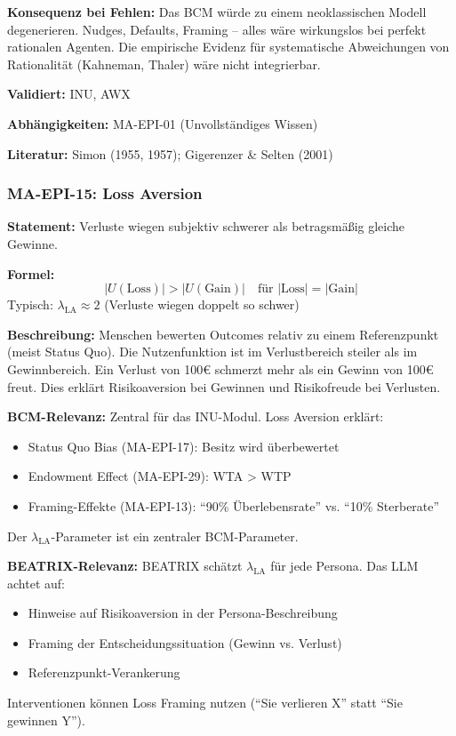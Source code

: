 \textbf{Konsequenz bei Fehlen:}
Das BCM würde zu einem neoklassischen Modell degenerieren. Nudges, Defaults, Framing -- alles wäre wirkungslos bei perfekt rationalen Agenten. Die empirische Evidenz für systematische Abweichungen von Rationalität (Kahneman, Thaler) wäre nicht integrierbar.

\textbf{Validiert:} INU, AWX

\textbf{Abhängigkeiten:} MA-EPI-01 (Unvollständiges Wissen)

\textbf{Literatur:} Simon (1955, 1957); Gigerenzer \& Selten (2001)


\subsubsection*{MA-EPI-15: Loss Aversion}

\textbf{Statement:} Verluste wiegen subjektiv schwerer als betragsmäßig gleiche Gewinne.

\textbf{Formel:}
\begin{equation}
|U(\text{Loss})| > |U(\text{Gain})| \quad \text{für } |\text{Loss}| = |\text{Gain}|
\end{equation}
Typisch: $\lambda_{\text{LA}} \approx 2$ (Verluste wiegen doppelt so schwer)

\textbf{Beschreibung:}
Menschen bewerten Outcomes relativ zu einem Referenzpunkt (meist Status Quo). Die Nutzenfunktion ist im Verlustbereich steiler als im Gewinnbereich. Ein Verlust von 100€ schmerzt mehr als ein Gewinn von 100€ freut. Dies erklärt Risikoaversion bei Gewinnen und Risikofreude bei Verlusten.

\textbf{BCM-Relevanz:}
Zentral für das INU-Modul. Loss Aversion erklärt:
\begin{itemize}
    \item Status Quo Bias (MA-EPI-17): Besitz wird überbewertet
    \item Endowment Effect (MA-EPI-29): WTA > WTP
    \item Framing-Effekte (MA-EPI-13): ``90\% Überlebensrate'' vs. ``10\% Sterberate''
\end{itemize}
Der $\lambda_{\text{LA}}$-Parameter ist ein zentraler BCM-Parameter.

\textbf{BEATRIX-Relevanz:}
BEATRIX schätzt $\lambda_{\text{LA}}$ für jede Persona. Das LLM achtet auf:
\begin{itemize}
    \item Hinweise auf Risikoaversion in der Persona-Beschreibung
    \item Framing der Entscheidungssituation (Gewinn vs. Verlust)
    \item Referenzpunkt-Verankerung
\end{itemize}
Interventionen können Loss Framing nutzen (``Sie verlieren X'' statt ``Sie gewinnen Y'').

